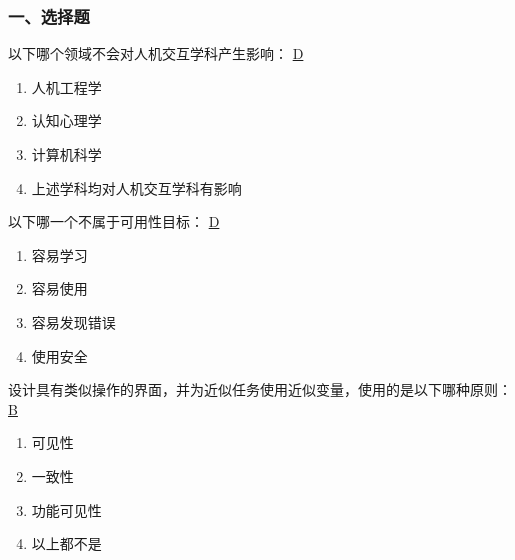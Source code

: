 \subsubsection*{一、选择题}
\setcounter{problemname}{0}

\begin{problem}
	以下哪个领域不会对人机交互学科产生影响：
	\uline{D}    
    \vspace{-0.8em}
    \begin{multicols}{2}
        \begin{enumerate}[label=\Alph*.]
            \item 人机工程学
            \item 认知心理学
            \item 计算机科学
            \item 上述学科均对人机交互学科有影响
        \end{enumerate}
    \end{multicols}
    \vspace{-1em}
\end{problem}



\begin{problem}
	‍以下哪一个不属于可用性目标：
	\uline{D}    
    \vspace{-0.8em}
    \begin{multicols}{4}
        \begin{enumerate}[label=\Alph*.]
            \item 容易学习
            \item 容易使用
            \item 容易发现错误
            \item 使用安全
        \end{enumerate}
    \end{multicols}
    \vspace{-1em}
\end{problem}



\begin{problem}
	‍设计具有类似操作的界面，并为近似任务使用近似变量，使用的是以下哪种原则：
	\uline{B}    
    \vspace{-0.8em}
    \begin{multicols}{4}
        \begin{enumerate}[label=\Alph*.]
            \item 可见性
            \item 一致性
            \item 功能可见性
            \item 以上都不是
        \end{enumerate}
    \end{multicols}
    \vspace{-1em}
\end{problem}



